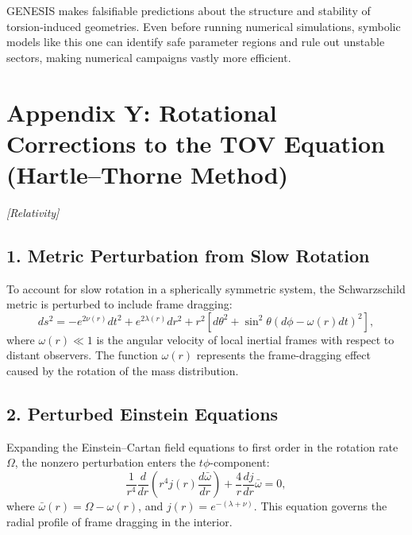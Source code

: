 \documentclass{article}
\newcommand{\grtag}{\textcolor{blue!40!black}{\textit{[Relativity]}}}
\begin{document}
\begin{tcolorbox}[colback=gray!5, colframe=black!30, title=Why this matters]
GENESIS makes falsifiable predictions about the structure and stability of torsion-induced geometries. Even before running numerical simulations, symbolic models like this one can identify safe parameter regions and rule out unstable sectors, making numerical campaigns vastly more efficient.
\end{tcolorbox}

\section*{Appendix Y: Rotational Corrections to the TOV Equation (Hartle--Thorne Method)}
\grtag


\label{app:hartle-thorne}

\subsection*{1. Metric Perturbation from Slow Rotation}
To account for slow rotation in a spherically symmetric system, the Schwarzschild metric is perturbed to include frame dragging:
\begin{equation}
  ds^2 = -e^{2\nu(r)} dt^2 + e^{2\lambda(r)} dr^2 + r^2 \left[d\theta^2 + \sin^2\theta (d\phi - \omega(r) dt)^2\right],
\end{equation}
where \( \omega(r) \ll 1 \) is the angular velocity of local inertial frames with respect to distant observers. The function \( \omega(r) \) represents the frame-dragging effect caused by the rotation of the mass distribution.

\subsection*{2. Perturbed Einstein Equations}
Expanding the Einstein–Cartan field equations to first order in the rotation rate \( \Omega \), the nonzero perturbation enters the \( t\phi \)-component:
\begin{equation}
  \frac{1}{r^4} \frac{d}{dr} \left( r^4 j(r) \frac{d\bar\omega}{dr} \right) + \frac{4}{r} \frac{dj}{dr} \bar\omega = 0,
\end{equation}
where \( \bar\omega(r) = \Omega - \omega(r) \), and \( j(r) = e^{-(\lambda + \nu)} \). This equation governs the radial profile of frame dragging in the interior.
\end{document}
